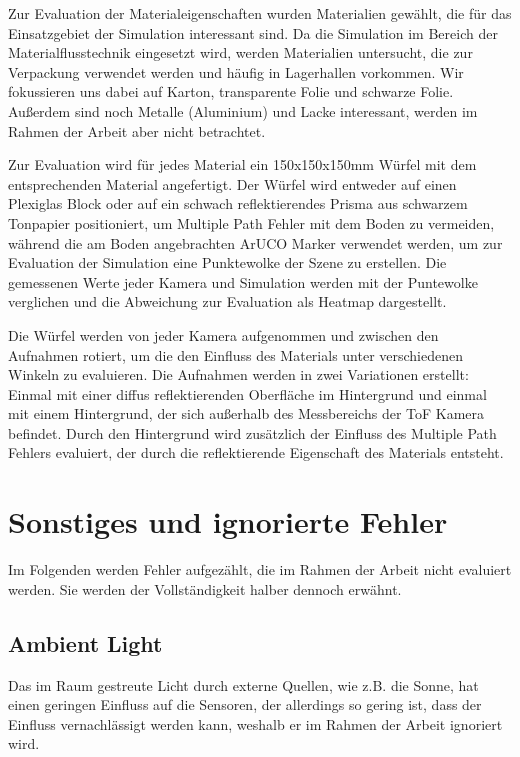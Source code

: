 \documentclass[thesis.tex]{subfiles}
\begin{document}
Zur Evaluation der Materialeigenschaften wurden Materialien gewählt, die für das Einsatzgebiet der Simulation interessant sind. Da die Simulation im Bereich der Materialflusstechnik eingesetzt wird, werden Materialien untersucht, die zur Verpackung verwendet werden und häufig in Lagerhallen vorkommen. Wir fokussieren uns dabei auf Karton, transparente Folie und schwarze Folie. Außerdem sind noch Metalle (Aluminium) und Lacke interessant, werden im Rahmen der Arbeit aber nicht betrachtet.

Zur Evaluation wird für jedes Material ein 150x150x150mm Würfel mit dem entsprechenden Material angefertigt. Der Würfel wird entweder auf einen Plexiglas Block oder auf ein schwach reflektierendes Prisma aus schwarzem Tonpapier positioniert, um Multiple Path Fehler mit dem Boden zu vermeiden, während die am Boden angebrachten ArUCO Marker verwendet werden, um zur Evaluation der Simulation eine Punktewolke der Szene zu erstellen. Die gemessenen Werte jeder Kamera und Simulation werden mit der Puntewolke verglichen und die Abweichung zur Evaluation als Heatmap dargestellt.

Die Würfel werden von jeder Kamera aufgenommen und zwischen den Aufnahmen rotiert, um die den Einfluss des Materials unter verschiedenen Winkeln zu evaluieren. Die Aufnahmen werden in zwei Variationen erstellt: Einmal mit einer diffus reflektierenden Oberfläche im Hintergrund und einmal mit einem Hintergrund, der sich außerhalb des Messbereichs der ToF Kamera befindet. Durch den Hintergrund wird zusätzlich der Einfluss des Multiple Path Fehlers evaluiert, der durch die reflektierende Eigenschaft des Materials entsteht.

\newpage

\section{Sonstiges und ignorierte Fehler}

Im Folgenden werden Fehler aufgezählt, die im Rahmen der Arbeit nicht evaluiert werden. Sie werden der Vollständigkeit halber dennoch erwähnt.

\subsection{Ambient Light}

Das im Raum gestreute Licht durch externe Quellen, wie z.B. die Sonne, hat einen geringen Einfluss auf die Sensoren, der allerdings so gering ist, dass der Einfluss vernachlässigt werden kann, weshalb er im Rahmen der Arbeit ignoriert wird.
\end{document}
